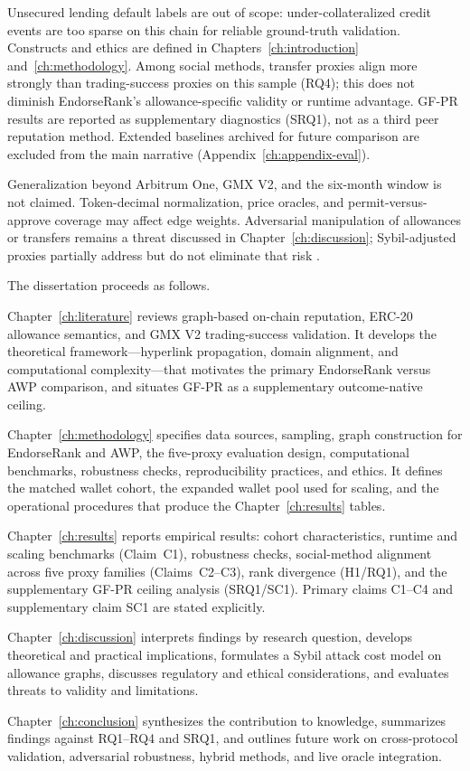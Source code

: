 Unsecured lending default labels are out of scope: under-collateralized credit events are too sparse on this chain for reliable ground-truth validation. Constructs and ethics are defined in Chapters~\ref{ch:introduction} and~\ref{ch:methodology}. Among social methods, transfer proxies align more strongly than trading-success proxies on this sample (RQ4); this does not diminish EndorseRank's allowance-specific validity or runtime advantage. GF-PR results are reported as supplementary diagnostics (SRQ1), not as a third peer reputation method. Extended baselines archived for future comparison are excluded from the main narrative (Appendix~\ref{ch:appendix-eval}).

Generalization beyond Arbitrum One, GMX V2, and the six-month window is not claimed. Token-decimal normalization, price oracles, and permit-versus-approve coverage may affect edge weights. Adversarial manipulation of allowances or transfers remains a threat discussed in Chapter~\ref{ch:discussion}; Sybil-adjusted proxies partially address but do not eliminate that risk .


The dissertation proceeds as follows.

Chapter~\ref{ch:literature} reviews graph-based on-chain reputation, ERC-20 allowance semantics, and GMX V2 trading-success validation. It develops the theoretical framework---hyperlink propagation, domain alignment, and computational complexity---that motivates the primary EndorseRank versus AWP comparison, and situates GF-PR as a supplementary outcome-native ceiling.

Chapter~\ref{ch:methodology} specifies data sources, sampling, graph construction for EndorseRank and AWP, the five-proxy evaluation design, computational benchmarks, robustness checks, reproducibility practices, and ethics. It defines the matched wallet cohort, the expanded wallet pool used for scaling, and the operational procedures that produce the Chapter~\ref{ch:results} tables.

Chapter~\ref{ch:results} reports empirical results: cohort characteristics, runtime and scaling benchmarks (Claim~C1), robustness checks, social-method alignment across five proxy families (Claims~C2--C3), rank divergence (H1/RQ1), and the supplementary GF-PR ceiling analysis (SRQ1/SC1). Primary claims C1--C4 and supplementary claim SC1 are stated explicitly.

Chapter~\ref{ch:discussion} interprets findings by research question, develops theoretical and practical implications, formulates a Sybil attack cost model on allowance graphs, discusses regulatory and ethical considerations, and evaluates threats to validity and limitations.

Chapter~\ref{ch:conclusion} synthesizes the contribution to knowledge, summarizes findings against RQ1--RQ4 and SRQ1, and outlines future work on cross-protocol validation, adversarial robustness, hybrid methods, and live oracle integration.
